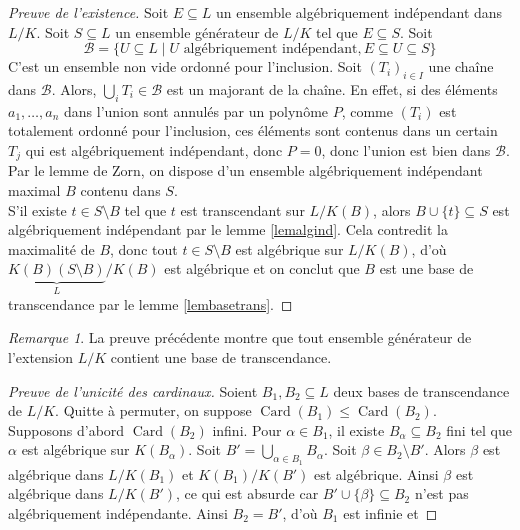 \documentclass{article}
\DeclareMathOperator{\Card}{Card}
\renewcommand{\subset}{\subseteq}
\theoremstyle{plain}
\theoremstyle{definition}
\theoremstyle{remark}
\newtheorem*{remark}{Remarque}
\begin{document}
\begin{proof}[Preuve de l'existence]
    Soit $E \subseteq L$ un ensemble algébriquement indépendant dans $L/K$. Soit $S \subseteq L$ un ensemble générateur de $L/K$ tel que $E \subset S$. Soit
    \[\mathcal{B} = \{U \subseteq L \mid U \text{ algébriquement indépendant}, E  \subseteq U \subseteq S \}\]
    C'est un ensemble non vide ordonné pour l'inclusion. Soit $(T_i)_{i\in I}$ une chaîne dans $\mathcal{B}$. Alors, $\bigcup\limits_i T_i \in \mathcal{B}$ est un majorant de la chaîne. En effet, si des éléments $a_1,\dots,a_n$ dans l'union sont annulés par un polynôme $P$, comme $(T_i)$ est totalement ordonné pour l'inclusion, ces éléments sont contenus dans un certain $T_j$ qui est algébriquement indépendant, donc $P = 0$, donc l'union est bien dans $\mathcal{B}$. Par le lemme de Zorn, on dispose d'un ensemble algébriquement indépendant maximal $B$ contenu dans $S$. \\
    S'il existe $t \in S \setminus B$ tel que $t$ est transcendant sur $L/K(B)$, alors $B \cup \{t\} \subseteq S$ est algébriquement indépendant par le lemme \ref{lemalgind}. Cela contredit la maximalité de $B$, donc tout $t \in S \setminus B$ est algébrique sur $L/K(B)$, d'où $\underbrace{K(B)(S\setminus B)}_L/K(B)$ est algébrique et on conclut que $B$ est une base de transcendance par le lemme \ref{lembasetrans}.
\end{proof}

\begin{remark}
    La preuve précédente montre que tout ensemble générateur de l'extension $L/K$ contient une base de transcendance.
\end{remark}

\begin{proof}[Preuve de l'unicité des cardinaux]
    Soient $B_1,B_2 \subseteq L$ deux bases de transcendance de $L/K$. Quitte à permuter, on suppose $\Card(B_1) \le \Card(B_2)$. \\
    Supposons d'abord $\Card(B_2)$ infini. Pour $\alpha \in B_1$, il existe $B_\alpha \subseteq B_2$ fini tel que $\alpha$ est algébrique sur $K(B_\alpha)$. Soit $B' = \bigcup\limits_{\alpha \in B_1} B_\alpha$. Soit $\beta \in B_2 \setminus B'$. Alors $\beta$ est algébrique dans $L/K(B_1)$ et $K(B_1)/K(B')$ est algébrique. Ainsi $\beta$ est algébrique dans $L/K(B')$, ce qui est absurde car $B'\cup \{\beta\} \subseteq B_2$ n'est pas algébriquement indépendante. Ainsi $B_2 = B'$, d'où $B_1$ est infinie et 
\end{proof}
\end{document}
